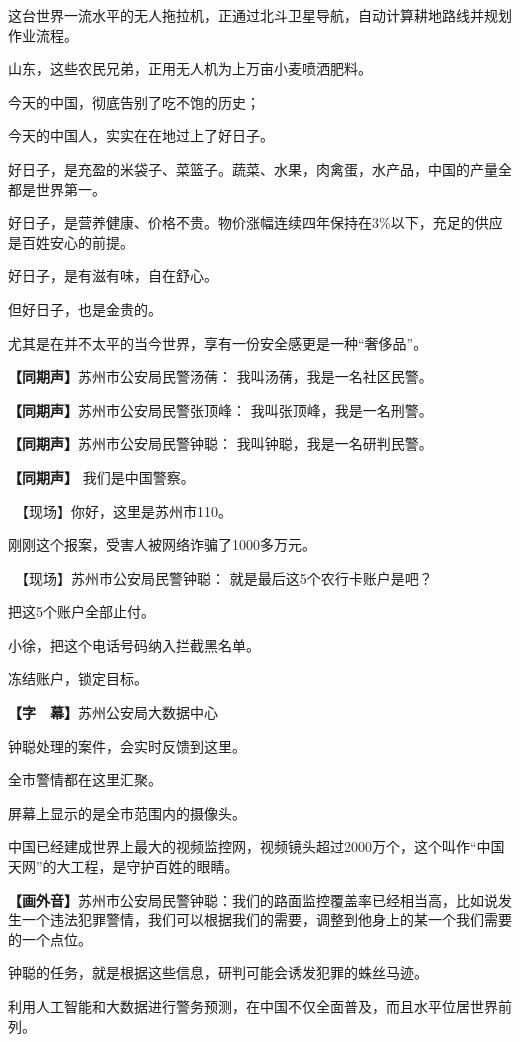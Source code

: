 \documentclass{ctexart}
\newcommand{\zkh}[1]{\textbf{\hspace{-2.7em} 【#1】}}
\begin{document}
这台世界一流水平的无人拖拉机，正通过北斗卫星导航，自动计算耕地路线并规划作业流程。

 山东，这些农民兄弟，正用无人机为上万亩小麦喷洒肥料。

 今天的中国，彻底告别了吃不饱的历史；

 今天的中国人，实实在在地过上了好日子。

好日子，是充盈的米袋子、菜篮子。蔬菜、水果，肉禽蛋，水产品，中国的产量全都是世界第一。

好日子，是营养健康、价格不贵。物价涨幅连续四年保持在3{\%}以下，充足的供应是百姓安心的前提。

 好日子，是有滋有味，自在舒心。

 但好日子，也是金贵的。

 尤其是在并不太平的当今世界，享有一份安全感更是一种``奢侈品''。

 \zkh{同期声}苏州市公安局民警汤蒨： 我叫汤蒨，我是一名社区民警。

 \zkh{同期声}苏州市公安局民警张顶峰： 我叫张顶峰，我是一名刑警。

 \zkh{同期声}苏州市公安局民警钟聪： 我叫钟聪，我是一名研判民警。

 \zkh{同期声} 我们是中国警察。

 　【现场】你好，这里是苏州市110。

 刚刚这个报案，受害人被网络诈骗了1000多万元。

 　【现场】苏州市公安局民警钟聪： 就是最后这5个农行卡账户是吧？

 把这5个账户全部止付。

 小徐，把这个电话号码纳入拦截黑名单。

 冻结账户，锁定目标。

 \zkh{字　幕}苏州公安局大数据中心

 钟聪处理的案件，会实时反馈到这里。

 全市警情都在这里汇聚。

 屏幕上显示的是全市范围内的摄像头。

中国已经建成世界上最大的视频监控网，视频镜头超过2000万个，这个叫作``中国天网''的大工程，是守护百姓的眼睛。

 \zkh{画外音}苏州市公安局民警钟聪：我们的路面监控覆盖率已经相当高，比如说发生一个违法犯罪警情，我们可以根据我们的需要，调整到他身上的某一个我们需要的一个点位。

 钟聪的任务，就是根据这些信息，研判可能会诱发犯罪的蛛丝马迹。

利用人工智能和大数据进行警务预测，在中国不仅全面普及，而且水平位居世界前列。
\end{document}
